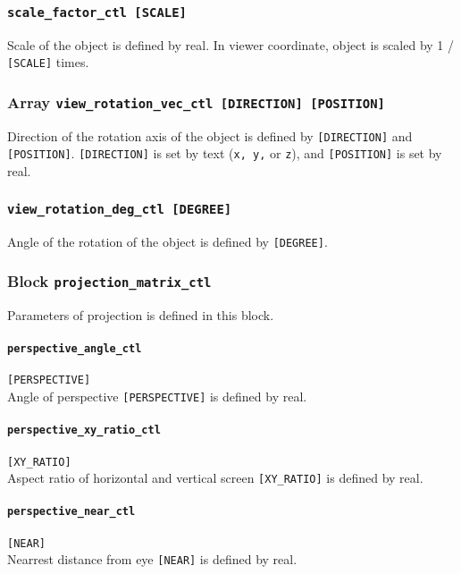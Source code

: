 \subsubsection{\tt scale\_factor\_ctl  [SCALE]}
\label{href_t:scale_factor_ctl}
Scale of the object is defined by real. In viewer coordinate, object is scaled by 1 / \verb|[SCALE]| times.

\subsubsection{Array {\tt view\_rotation\_vec\_ctl [DIRECTION] [POSITION]}}
\label{href_t:view_rotation_vec_ctl}
Direction of the rotation axis of the object is defined by \verb|[DIRECTION]| and \verb|[POSITION]|. \verb|[DIRECTION]| is set by text (\verb|x, y,| or \verb|z|), and \verb|[POSITION]| is set by real.

\subsubsection{\tt view\_rotation\_deg\_ctl  [DEGREE]}
\label{href_t:view_rotation_deg_ctl}
Angle of the rotation of the object is defined by \verb|[DEGREE]|.

\subsubsection{Block {\tt projection\_matrix\_ctl}}
\label{href_t:projection_matrix_ctl}
Parameters of projection is defined in this block.

\paragraph{\tt perspective\_angle\_ctl}
\label{href_t:perspective_angle_ctl}
\verb|[PERSPECTIVE]| \\
Angle of perspective \verb|[PERSPECTIVE]| is defined by real.

\paragraph{\tt perspective\_xy\_ratio\_ctl}
\label{href_t:perspective_xy_ratio_ctl}
\verb|[XY_RATIO]| \\
Aspect ratio of horizontal and vertical screen \verb|[XY_RATIO]| is defined by real.

\paragraph{\tt perspective\_near\_ctl}
\label{href_t:perspective_near_ctl}
\verb|[NEAR]| \\
Nearrest distance from eye \verb|[NEAR]| is defined by real.

